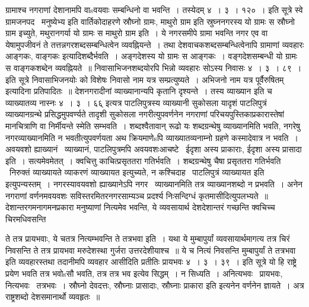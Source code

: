 \documentclass[11pt, openany]{book}
\begin{document}
{ग्रामाश्च नगराणां देशानामपि वाsवयवाः सम्बन्धिनो वा भवन्ति~। तस्येदम् ४~। ३~। १२०~। इति सूत्रे स्वे ग्रामजनपद \textendash\ मनुष्येभ्य इति वार्तिकोदाहरणे स्रौघ्नो ग्रामः, माथुरो ग्राम इति स्रुघ्ननगरस्य यो ग्रामः स स्रौघ्नो ग्राम इच्युते, मथुरानगर्या यो ग्रामः स माथुरो ग्राम इति~। ये नगरसमीपे ग्रामा भवन्ति नगर एव वा येषामुपजीवनं ते तत्तन्नगरशब्दसम्बन्धित्वेन व्यवह्नियन्ते~। तथा देशवाचकशब्दसम्बन्धित्वेनापि ग्रामाणां व्यवहारः {\qt आङ्गकः, वाङ्गकः} इत्यादिशब्दैर्भवति~। अङ्गदेशस्य यो ग्रामः स आङ्गकः~। वङ्गदेशसम्बन्धी यो ग्रामः स वाङ्गकशब्देन व्यवह्नियते~॥ निवासाभिजनशब्दयोरपि भिन्नो व्यवहारः सोऽस्य निवासः ४~। ३~। ८९~। इति सूत्रे {\qt निवासाभिजनयोः को विशेषः निवासो नाम यत्र सम्प्रत्युष्यते~। अभिजनो नाम यत्र पूर्वैरुषितम्} इत्यादिना प्रतिपादितः~॥ देशनगरादीनां व्याख्यानान्यपि कृतानि दृश्यन्ते~। तस्य व्याख्यान इति च व्याख्यातव्य नास्नः ४~। ३~। ६६् इत्यत्र {\qt पाटलिपुत्रस्य व्याख्यानी सुकोसला} यादृशं पाटलिपुत्रं व्याख्यानग्रन्थे प्रसिद्धमुपवर्ण्यते तादृशी सुकोसला नगरीत्युपवर्णनेन नगराणां परिचयपुस्तिकाप्रकारास्तेषां मानचित्राणि वा निर्मीयन्ते स्मेति सम्भवति~। शब्दश्वैतावान् रूढो यः शब्दग्रन्थेषु व्याख्यानमिति भवति, नगरेषु नगरव्याख्यानमिति न भवतीत्युपवर्णयता {\qt अथ क्रियमाणेsपि व्याख्यातव्यनाम्नो ग्रहणे कस्मादेवात्र न भवति~। अवयवशो ह्याख्यानं \textendash\ व्याख्यानं, पाटलिपुत्रमपि अवयवशःआचष्टे \textendash\ ईदृशा अस्य प्राकाराः, ईदृशा अस्य प्रासादा इति~। सत्यमेवमेतत्~। क्वचित्तु काचित्प्रसृततरा गतिर्भवति~। शब्दग्रन्थेषु चैषा प्रसृततरा गतिर्भवति \textendash\ निरुक्तं व्याख्यायते व्याकरणं व्याख्यायत इत्युच्यते, न कश्चिदाह \textendash\ पाटलिपुत्रं व्याख्यायत इति} इत्युपन्यस्तम्~। नगरस्यावयवशो ह्याख्यानेऽपि नगर \textendash\ व्याख्यानमिति तत्र व्याख्यानशब्दो न प्रभवति~। अनेन नगराणां वर्णनमवयवशः सविस्तरमितरनगरसाम्यञ्च प्रदर्श्य निःसन्दिग्धं कृतमासीदित्युपलभ्यते~॥\\

देशान्तरगमनागमनप्रकारा मनुष्याणां नित्यमेव भवन्ति, ये व्यवसायार्थ देशदेशान्तरं गच्छन्ति क्वचिच्च चिरमधिवसन्ति 

\newpage

\noindent
ते तत्र प्रायभवाः, ये चतत्र नित्यम्भवन्ति ते तत्रभवा इति~। यथा ये मुम्बापुर्यां व्यवसायार्थमागत्य तत्र चिरं निवसन्ति ते तत्र प्रायभवा मरुदेशस्था गुर्जरा उत्तरदेशीयाश्च~॥ ये च नित्यं निवसन्ति मुम्बापुर्यां ते तत्रभवा इति व्यवहारस्तथा तदानीमपि व्यवहार आसीदिति प्रतीतिः प्रायभवः ४~। ३~। ३९~। इति सूत्रे यो हि राष्ट्रे प्रयेण भवति तत्र भवोsसौ भवति, तत्र तत्र भव इत्येव सिद्धम्~। न सिध्यति~। अनित्यभवः \textendash\ प्रायभवः, नित्यभवः \textendash\ तत्रभवः~। स्रौघ्नो देवदत्तः, स्रौघ्नाः प्रासादाः, स्रौघ्नाः प्राकारा इति इत्यनेन वर्णनेन ज्ञायते~। अत्र राष्ट्रशब्दो देशसमानार्थो व्यवहृतः~॥ \\

}
\end{document}
